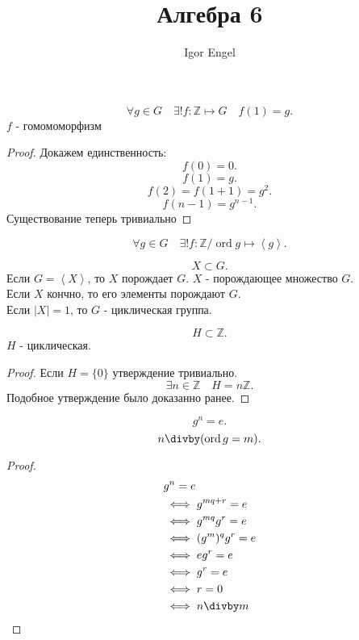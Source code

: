 \documentclass[11pt, oneside]{article}   	%
\title{Алгебра 6}
\author{Igor Engel}
\date{}
\DeclareMathOperator{\odr}{ord}
\begin{document}
\maketitle
\section{}
    \begin{theorem}
        \[ \forall{g\in G}\quad \exists!{f: \mathbb{Z} \mapsto  G}\quad f(1) = g  .\] 
        $f$ - гомомоморфизм
        \begin{proof}
            Докажем единственность:
            \[ f(0) = 0 .\]
            \[ f(1) = g .\]
            \[ f(2) = f(1+1) = g^2 .\]
            \[ f(n-1) = g^{n-1} .\]
            Существование теперь тривиально 
        \end{proof}
    \end{theorem}
    \begin{theorem}
        \[ \forall{g\in G}\quad \exists!{f: \mathbb{Z}/\odr g \mapsto \left<g\right>} .\] 
    \end{theorem}
    \begin{definition}
        \[ X \subset G .\]
        Если $G = \left<X\right>$, то $X$ порождает $G$. $X$ - порождающее множество $G$.\\
        Если $X$ кончно, то его элементы порождают $G$.\\
        Если $|X| = 1$, то $G$ - циклическая группа.
    \end{definition}
    \begin{dlemma}
        \[ H \subset \mathbb{Z} .\]
        $H$ - циклическая.
        \begin{proof}
            Если $H = \{0\} $ утверждение тривиально.
            \[ \exists{n\in \mathbb{Z}}\quad H = n \mathbb{Z}  .\]
            Подобное утверждение было доказанно ранее.
        \end{proof}
    \end{dlemma}
    \begin{dlemma}
        \[ g^{n} = e .\]
        \[ n\divby (\odr g=m) .\]
        \begin{proof}
            \begin{equation*}
                \begin{split} 
                    &g^{n} = e\\
                    &\iff g^{mq+r} = e\\
                    &\iff g^{mq}g^{r} = e\\
                    &\iff (g^{m})^{q}g^{r} = e\\
                    &\iff eg^{r} = e\\
                    &\iff g^{r} = e\\
                    &\iff r = 0\\
                    &\iff n\divby m \qedhere  
                \end{split}
            \end{equation*}
        \end{proof}
    \end{dlemma}
\end{document}
